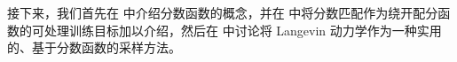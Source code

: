 接下来，我们首先在  中介绍分数函数的概念，并在  中将分数匹配作为绕开配分函数的可处理训练目标加以介绍，然后在  中讨论将 Langevin 动力学作为一种实用的、基于分数函数的采样方法。

















